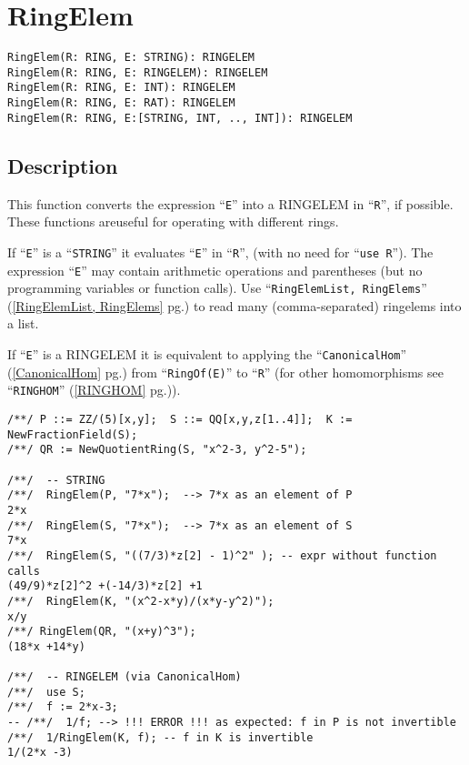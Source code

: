 \documentclass[a4paper]{mybook}
\newenvironment{command}{}{} %
\begin{document}
\section{RingElem}
\label{RingElem}
\begin{command} %


\begin{Verbatim}[label=syntax, rulecolor=\color{MidnightBlue},
frame=single]
RingElem(R: RING, E: STRING): RINGELEM
RingElem(R: RING, E: RINGELEM): RINGELEM
RingElem(R: RING, E: INT): RINGELEM
RingElem(R: RING, E: RAT): RINGELEM
RingElem(R: RING, E:[STRING, INT, .., INT]): RINGELEM
\end{Verbatim}


\subsection*{Description}

This function converts the expression ``\verb&E&'' into a RINGELEM in ``\verb&R&'',
if possible.  These functions areuseful for operating with different rings.
\par 
If ``\verb&E&'' is a ``\verb&STRING&'' it evaluates ``\verb&E&'' in ``\verb&R&'',
(with no need for ``\verb&use R&'').  The expression ``\verb&E&'' may contain
arithmetic operations and parentheses (but no programming variables or
function calls).  Use ``\verb&RingElemList, RingElems&'' (\ref{RingElemList, RingElems} pg.\pageref{RingElemList, RingElems}) to read many
(comma-separated) ringelems into a list.
\par 
If ``\verb&E&'' is a RINGELEM it is equivalent to applying the 
``\verb&CanonicalHom&'' (\ref{CanonicalHom} pg.\pageref{CanonicalHom}) from ``\verb&RingOf(E)&'' to ``\verb&R&''
(for other homomorphisms see ``\verb&RINGHOM&'' (\ref{RINGHOM} pg.\pageref{RINGHOM})).
\begin{Verbatim}[label=example, rulecolor=\color{PineGreen}, frame=single]
/**/ P ::= ZZ/(5)[x,y];  S ::= QQ[x,y,z[1..4]];  K := NewFractionField(S);
/**/ QR := NewQuotientRing(S, "x^2-3, y^2-5");

/**/  -- STRING
/**/  RingElem(P, "7*x");  --> 7*x as an element of P
2*x
/**/  RingElem(S, "7*x");  --> 7*x as an element of S
7*x
/**/  RingElem(S, "((7/3)*z[2] - 1)^2" ); -- expr without function calls
(49/9)*z[2]^2 +(-14/3)*z[2] +1
/**/  RingElem(K, "(x^2-x*y)/(x*y-y^2)");
x/y
/**/ RingElem(QR, "(x+y)^3");
(18*x +14*y)

/**/  -- RINGELEM (via CanonicalHom)
/**/  use S;
/**/  f := 2*x-3;
-- /**/  1/f; --> !!! ERROR !!! as expected: f in P is not invertible
/**/  1/RingElem(K, f); -- f in K is invertible
1/(2*x -3)


\end{Verbatim}
\end{command}
\end{document}

